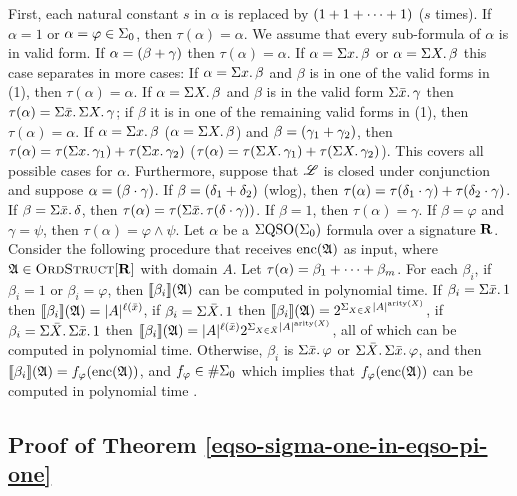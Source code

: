 First, each natural constant $s$ in $\alpha$ is replaced by $(1+ 1+\cdots+ 1)$ ($s$ times). If $\alpha = 1$ or $\alpha = \varphi \in \Sigma_{0}$, then $\tau(\alpha) = \alpha$. We assume that every sub-formula of $\alpha$ is in valid form. If $\alpha = (\beta + \gamma)$ then $\tau(\alpha) = \alpha$. If $\alpha = \Sigma{x}.\,\beta$ or $\alpha = \Sigma{X}.\,\beta$ this case separates in more cases: If $\alpha = \Sigma{x}.\,\beta$ and $\beta$ is in one of the valid forms in (1), then $\tau(\alpha) = \alpha$. If $\alpha = \Sigma{X}.\,\beta$ and $\beta$ is in the valid form $\Sigma{\bar{x}}.\,\gamma$ then $\tau(\alpha) = \Sigma{\bar{x}}.\,\Sigma{X}.\,\gamma$; if $\beta$ it is in one of the remaining valid forms in (1), then $\tau(\alpha) = \alpha$. If $\alpha = \Sigma{x}.\,\beta$ ($\alpha = \Sigma{X}.\,\beta$) and $\beta = (\gamma_1+\gamma_2)$, then $\tau(\alpha) = \tau(\Sigma{x}.\,\gamma_1) + \tau(\Sigma{x}.\,\gamma_2)$ ($\tau(\alpha) = \tau(\Sigma{X}.\,\gamma_1) + \tau(\Sigma{X}.\,\gamma_2)$). This covers all possible cases for $\alpha$. Furthermore, suppose that $\mathscr{L}$ is closed under conjunction and suppose $\alpha = (\beta\cdot\gamma)$. If $\beta = (\delta_1+\delta_2)$ (wlog), then $\tau(\alpha) = \tau(\delta_1\cdot\gamma)+\tau(\delta_2\cdot\gamma)$. If $\beta = \Sigma{\bar{x}}.\,\delta$, then $\tau(\alpha) = \tau(\Sigma{\bar{x}}.\,\tau(\delta\cdot\gamma))$. If $\beta = 1$, then $\tau(\alpha) = \gamma$. If $\beta = \varphi$ and $\gamma = \psi$, then $\tau(\alpha) = \varphi\wedge\psi$. Let $\alpha$ be a $\Sigma{\rm QSO}(\Sigma_{0})$ formula over a signature $\mathbf{R}$. Consider the following procedure that receives ${\rm enc}(\mathfrak{A})$ as input, where $\mathfrak{A}\in\text{\sc OrdStruct}[\mathbf{R}]$ with domain $A$. Let $\tau(\alpha) = \beta_1+\cdots+\beta_m$. For each $\beta_i$, if $\beta_i = 1$ or $\beta_i = \varphi$, then ${\llbracket{}{\beta_i}\rrbracket}(\mathfrak{A})$ can be computed in polynomial time. If $\beta_i = \Sigma{\bar{x}}.\,1$ then ${\llbracket{}{\beta_i}\rrbracket}(\mathfrak{A}) = \vert A \vert^{\ell(\bar{x})}$, if $\beta_i = \Sigma{\bar{X}}.\,1$ then ${\llbracket{}{\beta_i}\rrbracket}(\mathfrak{A}) = 2^{\Sigma_{X\in\bar{X}}\vert A \vert^{{\rm arity}(X)}}$, if $\beta_i = \Sigma{\bar{X}}.\,\Sigma{\bar{x}}.\,1$ then ${\llbracket{}{\beta_i}\rrbracket}(\mathfrak{A}) = \vert A \vert^{\ell(\bar{x})}2^{\Sigma_{X\in\bar{X}}\vert A \vert^{{\rm arity}(X)}}$, all of which can be computed in polynomial time. Otherwise, $\beta_i$ is $\Sigma{\bar{x}}.\,\varphi$ or $\Sigma{\bar{X}}.\,\Sigma{\bar{x}}.\,\varphi$, and then ${\llbracket{}{\beta_i}\rrbracket}(\mathfrak{A}) = f_{\varphi}({\rm enc}(\mathfrak{A}))$, and $f_{\varphi}\in \#\Sigma_{0}$ which implies that $f_{\varphi}({\rm enc}(\mathfrak{A}))$ can be computed in polynomial time \cite{SalujaST95}. 

\subsection{Proof of Theorem \ref{eqso-sigma-one-in-eqso-pi-one}}

